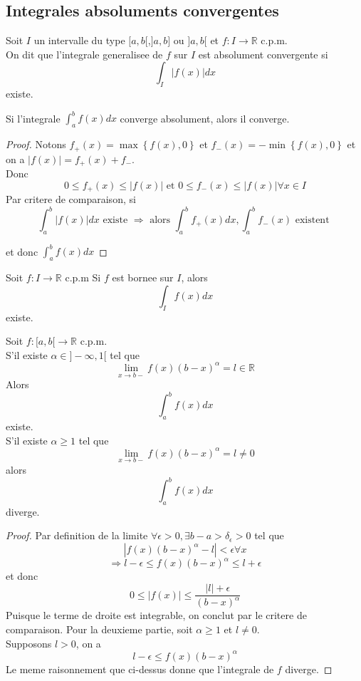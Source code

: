 \documentclass[../main.tex]{subfiles}
\begin{document}
\subsection{Integrales absoluments convergentes}
\begin{defn}\label{defn:Integrale absolument convergenteintegrale_absolument_convergente}
	Soit $I$ un intervalle du type $[a,b[$,$]a,b]$ ou $]a,b[$ et $f:I \to \mathbb{R}$ c.p.m.\\
	On dit que l'integrale generalisee de $f$ sur $I$ est absolument convergente si
	\[ 
		\int_I |f( x) | dx
	\]
	existe.
\end{defn}
\begin{thm}\label{thm:absolument convergente implique convergenteabsolument_convergente_implique_convergente}
	Si l'integrale $\int_{ a }^{ b }f( x) dx$ converge absolument, alors il converge.
\end{thm}
\begin{proof}
	Notons $f_+( x) = \max \left\{ f( x) , 0 \right\} $ et $f_-( x) = - \min \left\{ f( x) ,0 \right\} $ et on a
	$|f( x)| = f_+( x) + f_- $.\\
	Donc
	\[ 
		0 \leq f_+( x) \leq |f( x) | \text{ et  } 0 \leq f_-( x)  \leq |f( x) | \forall x \in I	
	\]
	Par critere de comparaison, si
	\[ 
		\int_{ a }^{ b }|f( x) | dx \text{ existe  } \Rightarrow \text{ alors } \int_{ a }^{ b }f_+( x)  dx , \int_{ a }^{ b }f_-( x) \text{ existent } 
	\]
	
	et donc $\int_{ a }^{ b }f( x) dx$	
\end{proof}
	
\begin{rmq}
Soit $f:I \to \mathbb{R}$ c.p.m Si $f$ est bornee sur $I$, alors  
\[ 
	\int_I f( x) dx
\]
existe.
\end{rmq}
\begin{thm}\label{thm:Critere de comparaison ( II) critere_de_comparaison_ii_}
	Soit $f: [ a,b[ \to \mathbb{R} $ c.p.m.\\
	S'il existe $\alpha \in ]- \infty ,1[$ tel que
	\[ 
		\lim_{x \to b-} f( x) ( b-x) ^{\alpha}= l \in \mathbb{R}
	\]
	Alors
	\[ 
		\int_{ a }^{ b }f( x) dx 
	\]
	existe.\\
	S'il existe $\alpha \geq 1$ tel que 
	\[ 
		\lim_{x \to b-} f( x) ( b-x) ^{\alpha}= l \neq 0 
	\]
	alors
	\[ 
		\int_{ a }^{ b }f( x) dx
	\]
	diverge.
	
\end{thm}
\begin{proof}
Par definition de la limite $\forall \epsilon >0, \exists b-a>\delta_\epsilon>0$ tel que
\[ 
	|f( x) ( b-x) ^{\alpha}-l| < \epsilon \forall x
\]
\[ 
	\Rightarrow l-\epsilon \leq f( x) ( b-x) ^{\alpha}\leq l+\epsilon
\]
et donc
\[ 
	0\leq |f( x) | \leq \frac{|l|+\epsilon}{( b-x)^{\alpha}}
\]
Puisque le terme de droite est integrable, on conclut par le critere de comparaison.
Pour la deuxieme partie, soit $\alpha\geq 1$ et $l\neq 0$.\\
Supposons $l>0$, on a
\[ 
	l-\epsilon \leq f( x) ( b-x) ^{\alpha}		
\]
Le meme raisonnement que ci-dessus donne que l'integrale de $f$ diverge.
\end{proof}
\end{document}
